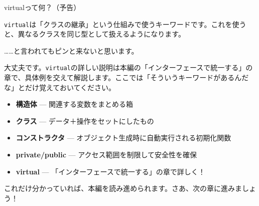 \begin{qabox}{virtualって何？（予告）}

\texttt{virtual}は「クラスの継承」という仕組みで使うキーワードです。これを使うと、異なるクラスを同じ型として扱えるようになります。

……と言われてもピンと来ないと思います。

大丈夫です。\texttt{virtual}の詳しい説明は本編の「インターフェースで統一する」の章で、具体例を交えて解説します。ここでは「そういうキーワードがあるんだな」とだけ覚えておいてください。

\begin{notebox}[ここまでのまとめ]
\begin{itemize}
  \item \textbf{構造体} — 関連する変数をまとめる箱
  \item \textbf{クラス} — データ＋操作をセットにしたもの
  \item \textbf{コンストラクタ} — オブジェクト生成時に自動実行される初期化関数
  \item \textbf{private/public} — アクセス範囲を制限して安全性を確保
  \item \textbf{virtual} — 「インターフェースで統一する」の章で詳しく！
\end{itemize}
\end{notebox}

これだけ分かっていれば、本編を読み進められます。さあ、次の章に進みましょう！

\end{qabox}

